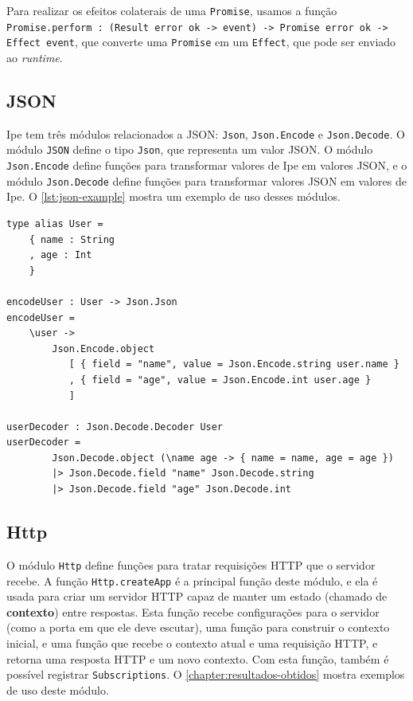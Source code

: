 Para realizar os efeitos colaterais de uma \texttt{Promise}, usamos a função
\texttt{Promise.perform : (Result error ok -> event) -> Promise error ok -> Effect event},
que converte uma \texttt{Promise} em um \texttt{Effect}, que pode ser enviado ao
\textit{runtime}.

\subsection{JSON}

Ipe tem três módulos relacionados a JSON: \texttt{Json}, \texttt{Json.Encode} e \texttt{Json.Decode}.
O módulo \texttt{JSON} define o tipo \texttt{Json}, que representa um valor JSON. O módulo \texttt{Json.Encode}
define funções para transformar valores de Ipe em valores JSON, e o módulo \texttt{Json.Decode} define
funções para transformar valores JSON em valores de Ipe. O \autoref{lst:json-example} mostra um exemplo
de uso desses módulos.

\begin{lstlisting}[label={lst:json-example},caption={Exemplo de uso dos módulos de JSON}]
type alias User =
    { name : String
    , age : Int
    }

encodeUser : User -> Json.Json
encodeUser =
    \user ->
        Json.Encode.object
           [ { field = "name", value = Json.Encode.string user.name }
           , { field = "age", value = Json.Encode.int user.age }
           ]

userDecoder : Json.Decode.Decoder User
userDecoder =
        Json.Decode.object (\name age -> { name = name, age = age })
        |> Json.Decode.field "name" Json.Decode.string
        |> Json.Decode.field "age" Json.Decode.int

\end{lstlisting}

\subsection{Http}\label{sec:lib-http}

O módulo \texttt{Http} define funções para tratar requisições HTTP que o servidor recebe. A função
\texttt{Http.createApp} é a principal função deste módulo, e ela é usada para criar um servidor HTTP
capaz de manter um estado (chamado de \textbf{contexto}) entre respostas. Esta função recebe
configurações para o servidor (como a porta em que ele deve escutar), uma função para construir o
contexto inicial, e uma função que recebe o contexto atual e uma requisição HTTP, e retorna uma
resposta HTTP e um novo contexto. Com esta função, também é possível registrar \texttt{Subscriptions}.
O \autoref{chapter:resultados-obtidos} mostra exemplos de uso deste módulo.

